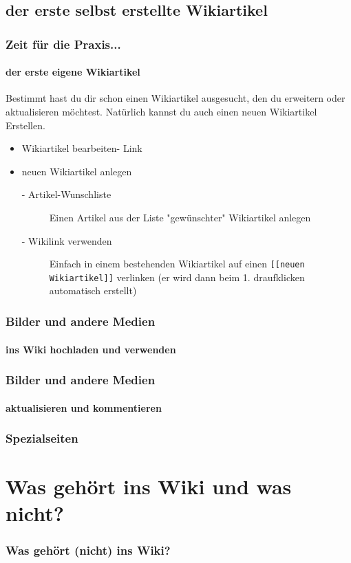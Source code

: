 \documentclass{beamer}              %
\begin{document}
\subsection{der erste selbst erstellte Wikiartikel}

\begin{frame}
  \frametitle{Zeit für die Praxis...}
  \framesubtitle{der erste eigene Wikiartikel}

  Bestimmt hast du dir schon einen Wikiartikel ausgesucht, den du erweitern oder aktualisieren möchtest. Natürlich kannst du auch einen neuen Wikiartikel Erstellen.
  
  \begin{itemize}
    \item Wikiartikel bearbeiten- Link
    \item neuen Wikiartikel anlegen
    \begin{description}
      \item[- Artikel-Wunschliste] Einen Artikel aus der Liste "gewünschter" Wikiartikel anlegen
      \item[- Wikilink verwenden] Einfach in einem bestehenden Wikiartikel auf einen \texttt{[[neuen Wikiartikel]]} verlinken (er wird dann beim 1. draufklicken automatisch erstellt)
    \end{description}
  \end{itemize}

\end{frame}

\begin{frame}
  \frametitle{Bilder und andere Medien}
  \framesubtitle{ins Wiki hochladen und verwenden}

\end{frame}


\begin{frame}
  \frametitle{Bilder und andere Medien}
  \framesubtitle{aktualisieren und kommentieren}

\end{frame}


\begin{frame}
  \frametitle{Spezialseiten}

\end{frame}

\section{Was gehört ins Wiki und was nicht?}

\begin{frame}
  \frametitle{Was gehört (nicht) ins Wiki?}

\end{frame}
\end{document}
